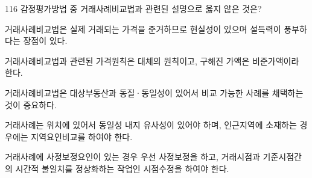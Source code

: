 \begin{question}{116}
감정평가방법 중 거래사례비교법과 관련된 설명으로 옳지 않은 것은?
\begin{choices}
  \item 거래사례비교법은 실제 거래되는 가격을 준거하므로 현실성이 있으며 설득력이 풍부하다는 장점이 있다.
  \item 거래사례비교법과 관련된 가격원칙은 대체의 원칙이고, 구해진 가액은 비준가액이라 한다.
  \item 거래사례비교법은 대상부동산과 동질·동일성이 있어서 비교 가능한 사례를 채택하는 것이 중요하다.
  \item 거래사례는 위치에 있어서 동일성 내지 유사성이 있어야 하며, 인근지역에 소재하는 경우에는 지역요인비교를 하여야 한다.
  \item 거래사례에 사정보정요인이 있는 경우 우선 사정보정을 하고, 거래시점과 기준시점간의 시간적 불일치를 정상화하는 작업인 시점수정을 하여야 한다.
\end{choices}
\end{question}
